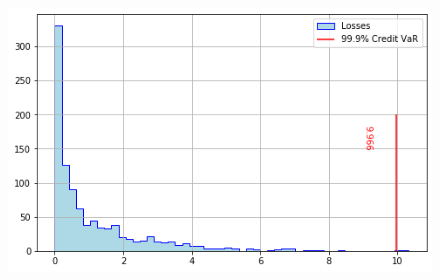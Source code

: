 \begin{figure}[htbp]
	\centering
\includegraphics[width=0.7\linewidth]{figures/cr_var_ex}
\end{figure}





